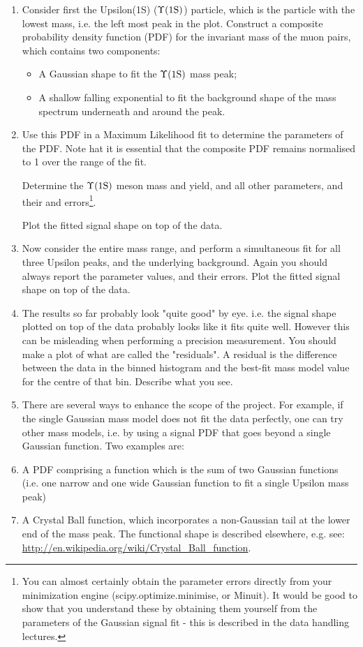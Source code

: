 \begin{enumerate}
\item Consider first the Upsilon(1S) ($\Upsilon \rm (1S)$) particle, which is the particle with the lowest mass, i.e. the left most  peak in the plot. Construct a composite probability density function (PDF) for the invariant mass of the muon pairs, which contains two components:
\begin{itemize}
\item A Gaussian shape to fit the  $\Upsilon \rm (1S)$ mass peak;
\item A shallow falling exponential to fit the background shape of the mass spectrum underneath and around the peak.
\end{itemize}

\item	Use this PDF in a Maximum Likelihood fit to determine the parameters of the PDF. Note hat it is essential that the composite PDF remains normalised to 1 over the range of the fit.

Determine the $\Upsilon \rm (1S)$  meson mass and yield, and all other parameters, and their and errors\footnote{You can almost certainly obtain the parameter errors directly from your minimization engine (scipy.optimize.minimise, or Minuit). It would be good to show that you understand these by obtaining them yourself from the parameters of the Gaussian signal fit - this is described in the data handling lectures.}.

Plot the fitted signal shape on top of the data.

\item Now consider the entire mass range, and perform a simultaneous fit for all three Upsilon peaks, and the underlying background. Again you should always report the parameter values, and their errors. Plot the fitted signal shape on top of the data.

\item The results so far probably look "quite good" by eye.  i.e. the signal shape plotted on top of the data probably looks like it fits quite well.  However this can be misleading when performing a precision measurement.  You should make a plot of what are called the "residuals". A residual is the difference between the data in the binned histogram and the best-fit mass model value for the centre of that bin. Describe what you see.

\item There are several ways to enhance the scope of the project. For example, if the single Gaussian mass model does not fit the data perfectly, one can try other mass models, i.e. by using a signal PDF that goes beyond a single Gaussian function.  Two examples are:
\item A PDF comprising a function which is the sum of two Gaussian functions (i.e. one narrow and one wide Gaussian function to fit a single Upsilon mass peak)
\item A Crystal Ball function, which incorporates a non-Gaussian tail at the lower end of the mass peak. The functional shape is described elsewhere, e.g. see: \url{http://en.wikipedia.org/wiki/Crystal_Ball_function}. 


\end{enumerate}
